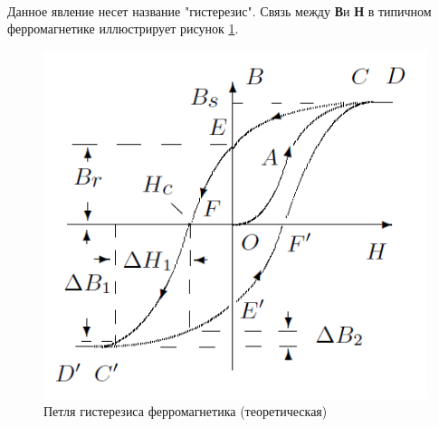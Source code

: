 \documentclass[a4paper,12pt]{article}
\begin{document}
\paragraph{} Данное явление несет название "гистерезис". Связь между \textbf{В}и \textbf{Н} в типичном ферромагнетике иллюстрирует рисунок \ref{plot_theory}.
\begin{figure}[h]
\centering
\includegraphics[scale=0.5]{plot_theory.png}
\caption{Петля гистерезиса ферромагнетика (теоретическая)}
\label{plot_theory}
\end{figure}
\end{document}
